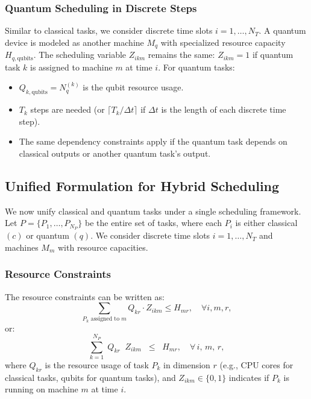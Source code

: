 \documentclass{article}
\newcommand{\aset}[1]{{{{#1}}}}       %
\begin{document}
\subsubsection{Quantum Scheduling in Discrete Steps}
Similar to classical tasks, we consider discrete time slots $i = 1,\dots,N_T$. A quantum device is modeled as another machine $M_{q}$ with specialized resource capacity $H_{q,\mathrm{qubits}}$. The scheduling variable $Z_{ikm}$ remains the same: $Z_{ikm} = 1$ if quantum task $k$ is assigned to machine $m$ at time $i$. For quantum tasks:
\begin{itemize}
  \item $Q_{k,\mathrm{qubits}} = N_{q}^{(k)}$ is the qubit resource usage.
  \item $T_k$ steps are needed (or $\lceil T_k / \Delta t \rceil$ if $\Delta t$ is the length of each discrete time step).
  \item The same dependency constraints apply if the quantum task depends on classical outputs or another quantum task's output.
\end{itemize}

\subsection{Unified Formulation for Hybrid Scheduling}
We now unify classical and quantum tasks under a single scheduling framework. Let $\aset{P} = \{ P_1, \dots, P_{N_P}\}$ be the entire set of tasks, where each $P_i$ is either classical $(c)$ or quantum $(q)$. We consider discrete time slots $i = 1,\dots,N_T$ and machines $M_m$ with resource capacities.

\subsubsection{Resource Constraints}
The resource constraints can be written as:
\begin{equation}
\sum_{P_k \text{ assigned to } m} Q_{kr} \cdot Z_{ikm} \le H_{mr}, \quad \forall i,m,r,
\end{equation}
or:
\begin{equation}
\sum_{k=1}^{N_P}\; Q_{kr} \;\; Z_{ikm} \;\;\le\;\; H_{mr},
\quad \forall\, i,\,m,\,r,
\end{equation}
where $Q_{kr}$ is the resource usage of task $P_k$ in dimension $r$ (e.g., CPU cores for classical tasks, qubits for quantum tasks), and $Z_{ikm} \in \{0,1\}$ indicates if $P_k$ is running on machine $m$ at time $i$. 
\end{document}
